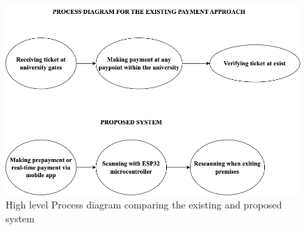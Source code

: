 \begin{figure}[h]
    \begin{center}
        \includegraphics[scale = 0.4]{images/process}
        \caption{High level Process diagram comparing the existing and proposed system}
    \end{center}
\end{figure}


\clearpage